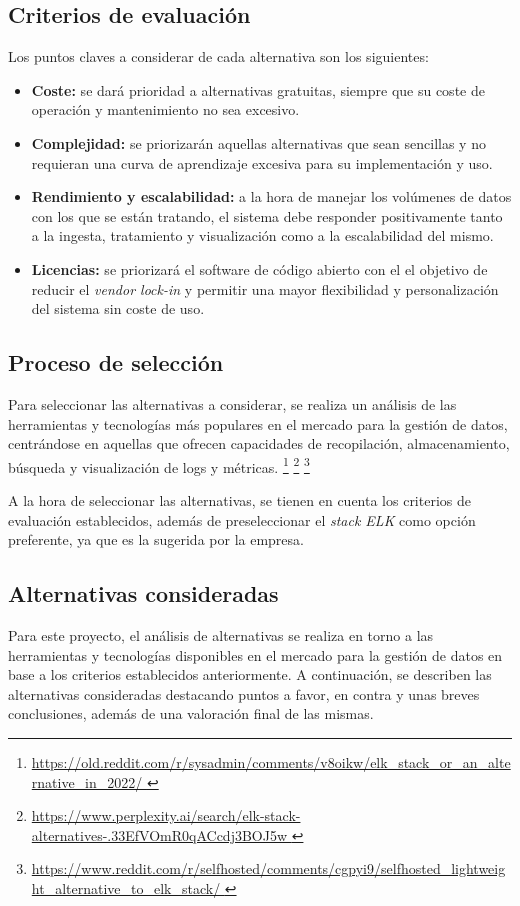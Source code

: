 \subsection{Criterios de evaluación}
Los puntos claves a considerar de cada alternativa son los siguientes:

\begin{itemize}
	\item \textbf{Coste:} se dará prioridad a alternativas gratuitas, siempre
		que su coste de operación y mantenimiento no sea excesivo.
	\item \textbf{Complejidad:} se priorizarán aquellas alternativas que
		sean sencillas y no requieran una curva de aprendizaje excesiva para
		su implementación y uso.
	\item \textbf{Rendimiento y escalabilidad:} a la hora de manejar los
		volúmenes de datos con los que se están tratando, el sistema debe
		responder positivamente tanto a la ingesta, tratamiento y visualización
		como a la escalabilidad del mismo.
	\item \textbf{Licencias:} se priorizará el software de código abierto con el
		el objetivo de reducir el \textit{vendor lock-in} y permitir una mayor
		flexibilidad y personalización del sistema sin coste de uso.
\end{itemize}


\subsection{Proceso de selección}
Para seleccionar las alternativas a considerar, se realiza un análisis de las
herramientas y tecnologías más populares en el mercado para la gestión de datos,
centrándose en aquellas que ofrecen capacidades de recopilación, almacenamiento,
búsqueda y visualización de logs y métricas. \footnote{\url{
	https://old.reddit.com/r/sysadmin/comments/v8oikw/elk_stack_or_an_alternative_in_2022/
}}
\footnote{\url{
	https://www.perplexity.ai/search/elk-stack-alternatives-.33EfVOmR0qACcdj3BOJ5w
}}
\footnote{\url{
	https://www.reddit.com/r/selfhosted/comments/cgpyi9/selfhosted_lightweight_alternative_to_elk_stack/
}}

A la hora de seleccionar las alternativas, se tienen en cuenta los criterios de
evaluación establecidos, además de preseleccionar el \textit{stack ELK} como
opción preferente, ya que es la sugerida por la empresa.


\subsection{Alternativas consideradas}
Para este proyecto, el análisis de alternativas se realiza en torno a las
herramientas y tecnologías disponibles en el mercado para la gestión de datos en
base a los criterios establecidos anteriormente. A continuación, se describen
las alternativas consideradas destacando puntos a favor, en contra y unas
breves conclusiones, además de una valoración final de las mismas.


